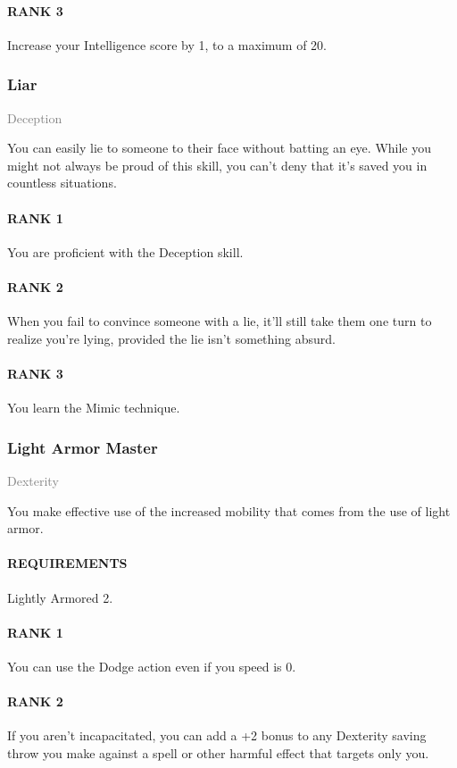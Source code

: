 \paragraph{RANK 3} Increase your Intelligence score by 1, to a maximum of 20.

\subsubsection{Liar} \label{feat::liar}
\small{\textcolor{gray}{Deception}}

\normalsize
You can easily lie to someone to their face without batting an eye.
While you might not always be proud of this skill, you can't deny that it's saved you in countless situations.
\paragraph{RANK 1} You are proficient with the Deception skill.
\paragraph{RANK 2} When you fail to convince someone with a lie, it'll still take them one turn to realize you're lying, provided the lie isn't something absurd.
\paragraph{RANK 3} You learn the Mimic technique.

\subsubsection{Light Armor Master} \label{feat::lightarmormaster}
\small{\textcolor{gray}{Dexterity}}

\normalsize
You make effective use of the increased mobility that comes from the use of light armor.
\paragraph{REQUIREMENTS} Lightly Armored 2.
\paragraph{RANK 1} You can use the Dodge action even if you speed is 0.
\paragraph{RANK 2} If you aren't incapacitated, you can add a +2 bonus to any Dexterity saving throw you make against a spell or other harmful effect that targets only you.
